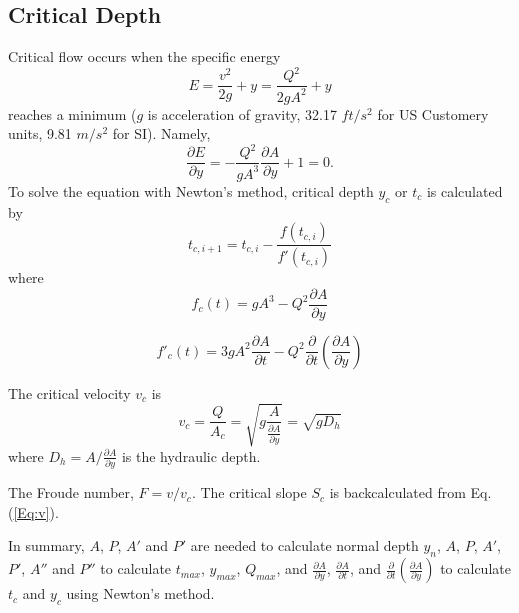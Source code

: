 \subsection{Critical Depth}
Critical flow occurs when the specific energy
\begin{equation}
E = \frac{v^2}{2g} + y =\frac{Q^2}{2gA^2} + y 
\end{equation}
reaches a minimum ($g$ is acceleration of gravity, 32.17 $ft/s^2$ for US Customery units, 9.81 $m/s^2$ for SI). Namely,
\begin{equation}
\frac{\partial E}{\partial y} =  -\frac{Q^2}{gA^3}\frac{\partial A}{\partial y} + 1 = 0.
\end{equation}
To solve the equation with Newton's method, critical depth $y_c$ or $t_c$ is calculated by
\begin{equation}  
t_{c,i+1} = t_{c,i} -\frac{f(t_{c,i})}{f'(t_{c,i})}
\end{equation}
where
\begin{equation}  
f_c(t)= gA^3 - Q^2\frac{\partial A}{\partial y} 
\label{Eq:C}
\end{equation}

\begin{equation}  
f'_c(t)= 3gA^2\frac{\partial A}{\partial t} - Q^2\frac{\partial}{\partial t}\left(\frac{\partial A}{\partial y}\right) 
\end{equation}

\noindent The critical velocity $v_c$ is 
\begin{equation}
v_c = \frac{Q}{A_c} = \sqrt{g \frac{A}{\frac{\partial A}{\partial y}}} = \sqrt{gD_h}
\end{equation}
where $D_h = A/\frac{\partial A}{\partial y}$ is the hydraulic depth.

\noindent The Froude number, $F = v/v_c$. The critical slope $S_c$ is backcalculated from Eq. (\ref{Eq:v}).

\noindent In summary, $A$, $P$, $A'$ and $ P'$ are needed to calculate normal depth $y_n$, $A$, $P$, $A'$, $ P'$, $A''$ and $P''$ to calculate $t_{max}$, $y_{max}$, $Q_{max}$, and  $\frac{\partial A}{\partial y}$,  $\frac{\partial A}{\partial t}$, and $\frac{\partial}{\partial t} \left(\frac{\partial A}{\partial y}\right)$ to calculate $t_c$ and $y_c$ using Newton's method.


